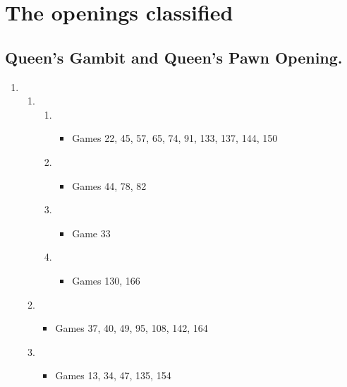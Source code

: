 \chapter{The openings classified}


\begin{multicols}{2}

\section{Queen's Gambit and Queen's Pawn Opening.}

\begin{enumerate}
\item \newgame{}
\begin{enumerate}
\item {}
\begin{enumerate}
\item {}
\begin{itemize}
\item Games 22, 45, 57, 65, 74, 91, 133, 137, 144, 150
\end{itemize}
\item {}
\begin{itemize}
\item Games 44, 78, 82
\end{itemize}
\item {}
\begin{itemize}
\item Game 33 
\end{itemize}
\item {}
\begin{itemize}
\item Games 130, 166
\end{itemize}
\end{enumerate}
\item {}
\begin{itemize}
\item Games 37, 40, 49, 95, 108, 142, 164
\end{itemize}
\item {}
\begin{itemize}
\item Games 13, 34, 47, 135, 154
\end{itemize}
\end{enumerate}

\end{enumerate}
\end{multicols}
